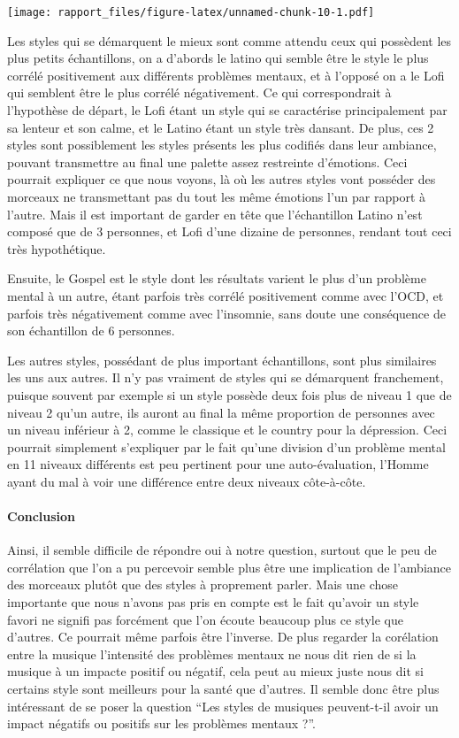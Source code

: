 \documentclass[
]{article}
\begin{document}
\texttt{[image: rapport\_files/figure-latex/unnamed-chunk-10-1.pdf]}

Les styles qui se démarquent le mieux sont comme attendu ceux qui
possèdent les plus petits échantillons, on a d'abords le latino qui
semble être le style le plus corrélé positivement aux différents
problèmes mentaux, et à l'opposé on a le Lofi qui semblent être le plus
corrélé négativement. Ce qui correspondrait à l'hypothèse de départ, le
Lofi étant un style qui se caractérise principalement par sa lenteur et
son calme, et le Latino étant un style très dansant. De plus, ces 2
styles sont possiblement les styles présents les plus codifiés dans leur
ambiance, pouvant transmettre au final une palette assez restreinte
d'émotions. Ceci pourrait expliquer ce que nous voyons, là où les autres
styles vont posséder des morceaux ne transmettant pas du tout les même
émotions l'un par rapport à l'autre. Mais il est important de garder en
tête que l'échantillon Latino n'est composé que de 3 personnes, et Lofi
d'une dizaine de personnes, rendant tout ceci très hypothétique.

Ensuite, le Gospel est le style dont les résultats varient le plus d'un
problème mental à un autre, étant parfois très corrélé positivement
comme avec l'OCD, et parfois très négativement comme avec l'insomnie,
sans doute une conséquence de son échantillon de 6 personnes.

Les autres styles, possédant de plus important échantillons, sont plus
similaires les uns aux autres. Il n'y pas vraiment de styles qui se
démarquent franchement, puisque souvent par exemple si un style possède
deux fois plus de niveau 1 que de niveau 2 qu'un autre, ils auront au
final la même proportion de personnes avec un niveau inférieur à 2,
comme le classique et le country pour la dépression. Ceci pourrait
simplement s'expliquer par le fait qu'une division d'un problème mental
en 11 niveaux différents est peu pertinent pour une auto-évaluation,
l'Homme ayant du mal à voir une différence entre deux niveaux
côte-à-côte.

\paragraph{\texorpdfstring{\textbf{Conclusion}}{Conclusion}}\label{conclusion-3}

Ainsi, il semble difficile de répondre oui à notre question, surtout que
le peu de corrélation que l'on a pu percevoir semble plus être une
implication de l'ambiance des morceaux plutôt que des styles à
proprement parler. Mais une chose importante que nous n'avons pas pris
en compte est le fait qu'avoir un style favori ne signifi pas forcément
que l'on écoute beaucoup plus ce style que d'autres. Ce pourrait même
parfois être l'inverse. De plus regarder la corélation entre la musique
l'intensité des problèmes mentaux ne nous dit rien de si la musique à un
impacte positif ou négatif, cela peut au mieux juste nous dit si
certains style sont meilleurs pour la santé que d'autres. Il semble donc
être plus intéressant de se poser la question ``Les styles de musiques
peuvent-t-il avoir un impact négatifs ou positifs sur les problèmes
mentaux ?''.
\end{document}
